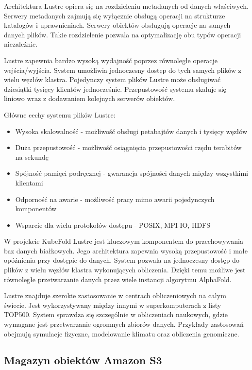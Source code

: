 Architektura Lustre opiera się na rozdzieleniu metadanych od danych właściwych.
Serwery metadanych zajmują się wyłącznie obsługą operacji na strukturze katalogów i uprawnieniach.
Serwery obiektów obsługują operacje na samych danych plików.
Takie rozdzielenie pozwala na optymalizację obu typów operacji niezależnie.

Lustre zapewnia bardzo wysoką wydajność poprzez równoległe operacje wejścia/wyjścia.
System umożliwia jednoczesny dostęp do tych samych plików z wielu węzłów klastra.
Pojedynczy system plików Lustre może obsługiwać dziesiątki tysięcy klientów jednocześnie.
Przepustowość systemu skaluje się liniowo wraz z dodawaniem kolejnych serwerów obiektów.

Główne cechy systemu plików Lustre:
\begin{itemize}
    \item Wysoka skalowalność - możliwość obsługi petabajtów danych i tysięcy węzłów
    \item Duża przepustowość - możliwość osiągnięcia przepustowości rzędu terabitów na sekundę
    \item Spójność pamięci podręcznej - gwarancja spójności danych między wszystkimi klientami
    \item Odporność na awarie - możliwość pracy mimo awarii pojedynczych komponentów
    \item Wsparcie dla wielu protokołów dostępu - POSIX, MPI-IO, HDFS
\end{itemize}

W projekcie KubeFold Lustre jest kluczowym komponentem do przechowywania baz danych białkowych.
Jego architektura zapewnia wysoką przepustowość i małe opóźnienia przy dostępie do danych.
System pozwala na jednoczesny dostęp do plików z wielu węzłów klastra wykonujących obliczenia.
Dzięki temu możliwe jest równoległe przetwarzanie danych przez wiele instancji algorytmu AlphaFold.

Lustre znajduje szerokie zastosowanie w centrach obliczeniowych na całym świecie.
Jest wykorzystywany między innymi w superkomputerach z listy TOP500.
System sprawdza się szczególnie w obliczeniach naukowych, gdzie wymagane jest przetwarzanie ogromnych zbiorów danych.
Przykłady zastosowań obejmują symulacje fizyczne, modelowanie klimatu oraz obliczenia genomiczne.

\subsection{Magazyn obiektów Amazon S3}

